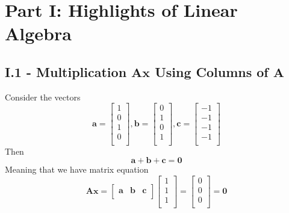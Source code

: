 \documentclass[a4paper]{article}
\begin{document}
\maketitle

\newpage
\tableofcontents

\newpage
\section{\textsf{Part I: Highlights of Linear Algebra}}

\subsection{\textsf{I.1 - Multiplication \texorpdfstring{\(\bm{Ax}\)}{Ax} Using Columns of \texorpdfstring{\(\bm{A}\)}{A}}}


Consider the vectors
\[
	\bm{a} = \begin{bmatrix}
		1 \\
		0 \\
		1 \\
		0 \\
	\end{bmatrix}
,
\bm{b} = \begin{bmatrix}
	0 \\
	1 \\
	0 \\
	1 \\
\end{bmatrix}
,
\bm{c} = \begin{bmatrix}
	-1 \\
	-1 \\
	-1 \\
	-1 \\
\end{bmatrix}
\]
Then
\[
	\bm{a} + \bm{b} + \bm{c} = \bm{0}
\]
Meaning that we have matrix equation
\[
	\bm{Ax} =
	\begin{bmatrix}
		\bm{a} & \bm{b} & \bm{c} \\
	\end{bmatrix}
\begin{bmatrix}
	1 \\
	1 \\
	1 \\
\end{bmatrix}
=
\begin{bmatrix}
	0 \\
	0 \\
	0 \\
\end{bmatrix}
=
\bm{0}
\]
\end{document}
